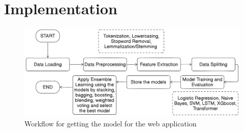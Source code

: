 

\section{Implementation}

\begin{figure}[h!]  
    \centering
    \includegraphics[width=1.0\textwidth]{Images/ML Model Workflow.png}  
    \caption{Workflow for getting the model for the web application}
    \label{model workflow}  %
\end{figure}


